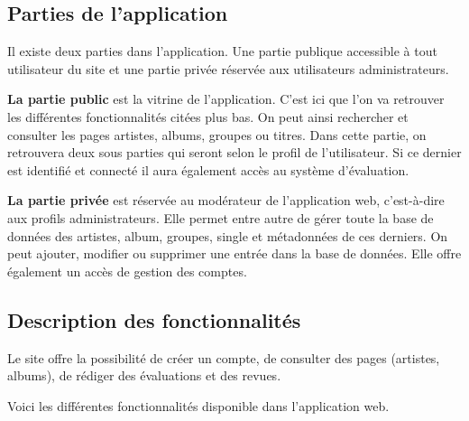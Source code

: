     \subsection{Parties de l'application}

        \begin{paragraphe}
            Il existe deux parties dans l'application. Une partie publique accessible à tout utilisateur du site et une partie
            privée réservée aux utilisateurs administrateurs.
        \end{paragraphe}

        \begin{paragraphe}
            \textbf{La partie public} est la vitrine de l'application. C'est ici que l'on
            va retrouver les différentes fonctionnalités citées plus bas. On peut
            ainsi rechercher et consulter les pages artistes, albums, groupes ou titres.
            Dans cette partie, on retrouvera deux sous parties qui seront selon le profil de 
            l'utilisateur.
            Si ce dernier est identifié et connecté il aura également accès au système d'évaluation.
        \end{paragraphe}

        \begin{paragraphe}
            \textbf{La partie privée} est réservée au modérateur de l'application web, c'est-à-dire 
            aux profils administrateurs.
            Elle permet entre autre de gérer toute la base de données des artistes,
            album, groupes, single et métadonnées de ces derniers. On peut ajouter, modifier
            ou supprimer une entrée dans la base de données.
            Elle offre également un accès de gestion des comptes.
        \end{paragraphe}

    \subsection{Description des fonctionnalités}

        \begin{paragraphe}
            Le site offre la possibilité de créer un compte, de consulter des pages
            (artistes, albums), de rédiger des évaluations et des revues.
        \end{paragraphe}

        \begin{paragraphe}
            Voici les différentes fonctionnalités disponible dans l'application web.
        \end{paragraphe}

